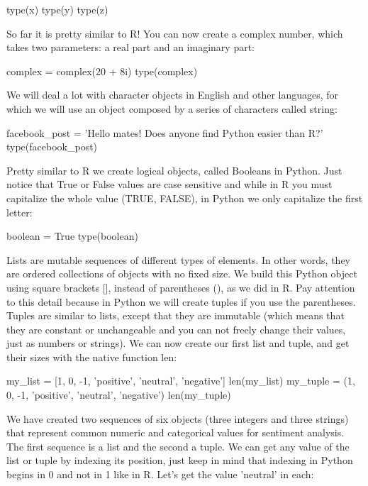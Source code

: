 \begin{examplepy}
type(x)
type(y)
type(z)
\end{examplepy}

So far it is pretty similar to R! You can now create a complex number, which takes two parameters: a real part and an imaginary part:

\begin{examplepy}
complex = complex(20 + 8i)
type(complex)
\end{examplepy}

We will deal a lot with character objects in English and other languages, for which we will use an object composed by a series of characters called string:

\begin{examplepy}
facebook_post = 'Hello mates! Does anyone find Python easier than R?'
type(facebook_post)
\end{examplepy}

Pretty similar to R we create logical objects, called Booleans in Python. Just notice that True or False values are case sensitive and while in R you must capitalize the whole value (TRUE, FALSE), in Python we only capitalize the first letter:

\begin{examplepy}
boolean = True
type(boolean)
\end{examplepy}

Lists are mutable sequences of different types of elements. In other words, they are ordered collections of objects with no fixed size. We build this Python object using square brackets [], instead of parentheses (), as we did in R. Pay attention to this detail because in Python we will create tuples if you use the parentheses. Tuples are similar to lists, except that they are immutable (which means that they are constant or unchangeable and you can not freely change their values, just as numbers or strings).  We can now create our first list and tuple, and get their sizes with the native function len:

\begin{examplepy}
my_list = [1, 0, -1, 'positive', 'neutral', 'negative']
len(my_list)
my_tuple = (1, 0, -1, 'positive', 'neutral', 'negative')
len(my_tuple)
\end{examplepy}
	
We have created two sequences of six objects (three integers and three strings) that represent common numeric and categorical values for sentiment analysis. The first sequence is a list and the second a tuple. We can get any value of the list or tuple by indexing its position, just keep in mind that indexing in Python begins in 0 and not in 1 like in R. Let's get the value 'neutral' in each:

